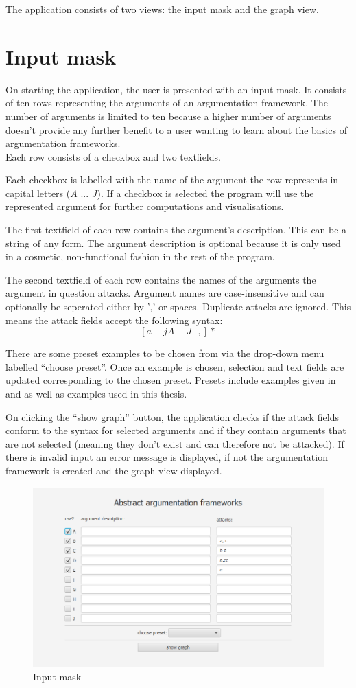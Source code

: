 \documentclass[draft,final]{vutinfth} %
\newcommand{\hl}{\par\vspace{6pt}} %
\begin{document}
The application consists of two views: the input mask and the graph view.

\section{Input mask}
On starting the application, the user is presented with an input mask. It consists of ten rows representing the arguments of an argumentation framework. The number of arguments is limited to ten because a higher number of arguments doesn't provide any further benefit to a user wanting to learn about the basics of argumentation frameworks.\\
Each row consists of a checkbox and two textfields.\hl
Each checkbox is labelled with the name of the argument the row represents in capital letters ($A$ ... $J$). If a checkbox is selected the program will use the represented argument for further computations and visualisations.\hl
The first textfield of each row contains the argument's description. This can be a string of any form. The argument description is optional because it is only used in a cosmetic, non-functional fashion in the rest of the program.\hl
The second textfield of each row contains the names of the arguments the argument in question attacks. Argument names are case-insensitive and can optionally be seperated either by ',' or spaces. Duplicate attacks are ignored. This means the attack fields accept the following syntax: \[[a-jA-J\text{ },]*\]\hl %

There are some preset examples to be chosen from via the drop-down menu labelled ``choose preset''. Once an example is chosen, selection and text fields are updated corresponding to the chosen preset. Presets include examples given in \cite{Dung} and \cite{Egly} as well as examples used in this thesis.\hl
On clicking the ``show graph'' button, the application checks if the attack fields conform to the syntax for selected arguments and if they contain arguments that are not selected (meaning they don't exist and can therefore not be attacked). If there is invalid input an error message is displayed, if not the argumentation framework is created and the graph view displayed.\hl

\FloatBarrier
	\begin{figure}[!ht]
		\centering
		\includegraphics[width=\linewidth]{pics/chaotic.png}
		\caption{Input mask}
	\end{figure}
\FloatBarrier
\end{document}

